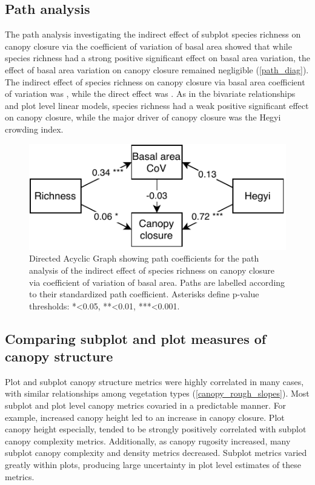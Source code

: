 \documentclass[11pt,a4paper]{article}
\begin{document}


\subsection{Path analysis}

The path analysis investigating the indirect effect of subplot species richness on canopy closure via the coefficient of variation of basal area showed that while species richness had a strong positive significant effect on basal area variation, the effect of basal area variation on canopy closure remained negligible (\autoref{path_diag}). The indirect effect of species richness on canopy closure via basal area coefficient of variation was \ccind{}, while the direct effect was \ccdir{}. As in the bivariate relationships and plot level linear models, species richness had a weak positive significant effect on canopy closure, while the major driver of canopy closure was the Hegyi crowding index.

\begin{figure}
	\includegraphics[width=0.8\linewidth]{path_diag}
	\caption{Directed Acyclic Graph showing path coefficients for the path analysis of the indirect effect of species richness on canopy closure via coefficient of variation of basal area. Paths are labelled according to their standardized path coefficient. Asterisks define p-value thresholds: *<0.05, **<0.01, ***<0.001.}
	\label{path_diag}
\end{figure}



\subsection{Comparing subplot and plot measures of canopy structure}

Plot and subplot canopy structure metrics were highly correlated in many cases, with similar relationships among vegetation types (\autoref{canopy_rough_slopes}). Most subplot and plot level canopy metrics covaried in a predictable manner. For example, increased canopy height led to an increase in canopy closure. Plot canopy height especially, tended to be strongly positively correlated with subplot canopy complexity metrics. Additionally, as canopy rugosity increased, many subplot canopy complexity and density metrics decreased. Subplot metrics varied greatly within plots, producing large uncertainty in plot level estimates of these metrics. 
\end{document}
